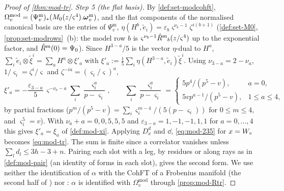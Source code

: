 \begin{proof}[Proof of \cref{thm:mod-tr}]
\emph{Step 5 (the flat basis).} By \cref{def:set-modcohft}, $\Omega^{\mathrm{mod}}_v=(\Psi^{\mathrm m}_v)_*(M_{0}(z/\varsigma^4).\boldsymbol{\omega}^{\mathrm m}_v)$, and the flat components of the normalised canonical basis are the entries of $\Psi^{\mathrm m}_v$, $\eta(H^b,\tilde e_i)=\varepsilon_b\varsigma^{\nu_b-1}\zeta^{i(b+1)}$ (\cref{def:set-M0}, \cref{prop:set-modrows}~(b): the model row $b$ is $\varsigma^{\nu_b-1}\hat{R}^{\mathrm m}{}_b(z/\varsigma^4)$ up to the exponential factor, and $\hat{R}^{\mathrm m}(0)=\Psi_0$). Since $H^{3-a}/5$ is the vector $\eta$-dual to $H^a$, $\sum_i\tilde e_i\otimes\tilde\xi^i=\sum_aH^a\otimes\xi'_a$ with $\xi'_a:=\frac15\sum_i\eta(H^{3-a},\tilde e_i)\tilde\xi^i$. Using $\nu_{3-a}=2-\nu_a$, $1/\varsigma_i=\zeta^i/\varsigma$ and $\zeta^{-ia}=(\varsigma_i/\varsigma)^a$,
\[
\xi'_a=-\frac{\varepsilon_{3-a}}{5}\,\varsigma^{-\nu_a-a}\sum_i\frac{\varsigma_i^a}{p-\varsigma_i},\qquad\sum_i\frac{\varsigma_i^a}{p-\varsigma_i}=\begin{cases}5p^4/(p^5-v),&a=0,\\ 5vp^{a-1}/(p^5-v),&1\leq a\leq 4,\end{cases}
\]
by partial fractions ($p^m/(p^5-v)=\sum_i\varsigma_i^{m-4}/(5(p-\varsigma_i))$ for $0\leq m\leq 4$, and $\varsigma_i^5=v$). With $\nu_a+a=0,0,5,5,5$ and $\varepsilon_{3-a}=1,-1,-1,1,1$ for $a=0,\dots,4$ this gives $\xi'_a=\xi_a$ of \cref{def:mod-xi}. Applying $D_x^d$ and $\dd$, \eqref{eq:mod-235} for $x=W_{v}$ becomes \eqref{eq:mod-tr}. The sum is finite since a correlator vanishes unless $\sum_ld_l\leq 3h-3+n$. Pairing each slot with a leg, by residues or along rays as in \cref{def:mod-pair} (an identity of forms in each slot), gives the second form. We use neither the identification of $\alpha$ with the CohFT of a Frobenius manifold (the second half of \cite[Thm.~8.1]{Dunin-Barkowski:2015caa}) nor \cite[Prop.~5.2]{Dunin-Barkowski:2015caa}: $\alpha$ is identified with $\Omega^{\mathrm{mod}}_v$ through \cref{prop:mod-Rtr}.
\end{proof}



